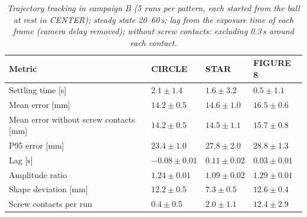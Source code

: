 \begin{table}[H]
\centering
\begin{tabularx}{\textwidth}{|X|l|l|l|}
\hline
\textbf{Metric} & \textbf{CIRCLE} & \textbf{STAR} & \textbf{FIGURE 8} \\ \hline
Settling time [s] & $2.1 \pm 1.4$ & $1.6 \pm 3.2$ & $0.5 \pm 1.1$ \\ \hline
Mean error [mm] & $14.2 \pm 0.5$ & $14.6 \pm 1.0$ & $16.5 \pm 0.6$ \\ \hline
Mean error without screw contacts [mm] & $14.2 \pm 0.5$ & $14.5 \pm 1.1$ & $15.7 \pm 0.8$ \\ \hline
P95 error [mm] & $23.4 \pm 1.0$ & $27.8 \pm 2.0$ & $28.8 \pm 1.3$ \\ \hline
Lag [s] & $-0.08 \pm 0.01$ & $0.11 \pm 0.02$ & $0.03 \pm 0.01$ \\ \hline
Amplitude ratio & $1.24 \pm 0.01$ & $1.09 \pm 0.02$ & $1.29 \pm 0.01$ \\ \hline
Shape deviation [mm] & $12.2 \pm 0.5$ & $7.3 \pm 0.5$ & $12.6 \pm 0.4$ \\ \hline
Screw contacts per run & $0.4 \pm 0.5$ & $2.0 \pm 1.1$ & $12.4 \pm 2.9$ \\ \hline
\end{tabularx}
\caption{\textit{Trajectory tracking in campaign B (5 runs per pattern, each started from the ball at rest in CENTER); steady state 20--60\,s; lag from the exposure time of each frame (camera delay removed); without screw contacts: excluding 0.3\,s around each contact.}}
\label{tab:test_patterns}
\end{table}
